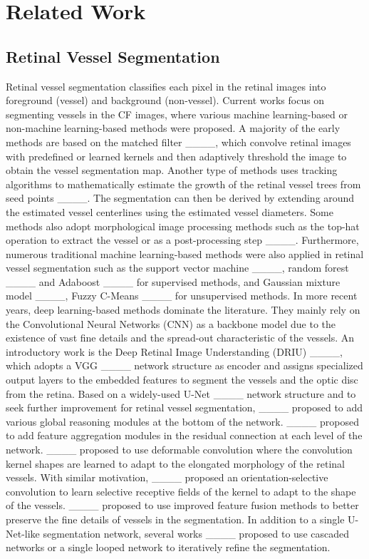 \section{Related Work}
\subsection{Retinal Vessel Segmentation}
Retinal vessel segmentation classifies each pixel in the retinal images into foreground (vessel) and background (non-vessel). Current works focus on segmenting vessels in the CF images, where various machine learning-based or non-machine learning-based methods were proposed. A majority of the early methods are based on the matched filter ____, which convolve retinal images with predefined or learned kernels and then adaptively threshold the image to obtain the vessel segmentation map. Another type of methods uses tracking algorithms to mathematically estimate the growth of the retinal vessel trees from seed points ____. The segmentation can then be derived by extending around the estimated vessel centerlines using the estimated vessel diameters. Some methods also adopt morphological image processing methods such as the top-hat operation to extract the vessel or as a post-processing step ____. Furthermore, numerous traditional machine learning-based methods were also applied in retinal vessel segmentation such as the support vector machine ____, random forest ____ and Adaboost ____ for supervised methods, and Gaussian mixture model ____, Fuzzy C-Means ____ for unsupervised methods. In more recent years, deep learning-based methods dominate the literature. They mainly rely on the Convolutional Neural Networks (CNN) as a backbone model due to the existence of vast fine details and the spread-out characteristic of the vessels. An introductory work is the Deep Retinal Image Understanding (DRIU) ____, which adopts a VGG ____ network structure as encoder and assigns specialized output layers to the embedded features to segment the vessels and the optic disc from the retina. Based on a widely-used U-Net ____ network structure and to seek further improvement for retinal vessel segmentation, ____ proposed to add various global reasoning modules at the bottom of the network. ____ proposed to add feature aggregation modules in the residual connection at each level of the network. ____ proposed to use deformable convolution where the convolution kernel shapes are learned to adapt to the elongated morphology of the retinal vessels. With similar motivation, ____ proposed an orientation-selective convolution to learn selective receptive fields of the kernel to adapt to the shape of the vessels. ____ proposed to use improved feature fusion methods to better preserve the fine details of vessels in the segmentation. In addition to a single U-Net-like segmentation network, several works ____ proposed to use cascaded networks or a single looped network to iteratively refine the segmentation. 

